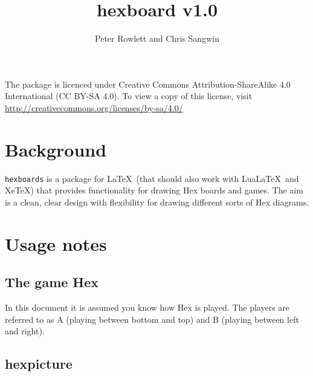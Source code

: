 \documentclass[a4paper,12pt]{article}
\title{hexboard v1.0}
\author{Peter Rowlett and Chris Sangwin}
\begin{document}
   
    
    \maketitle 
    
    The package is licenced under Creative Commons Attribution-ShareAlike 4.0 International (CC BY-SA 4.0). To view a copy of this license, visit \url{http://creativecommons.org/licenses/by-sa/4.0/}
    
    \begin{center}
        \begin{hexgame}[4]
        \end{hexgame}
    \end{center}
    
    \tableofcontents
    
    \section{Background}
    
    \verb|hexboards| is a package for \LaTeX\ (that should also work with Lua\LaTeX\ and Xe\TeX) that provides functionality for drawing Hex boards and games. The aim is a clean, clear design with flexibility for drawing different sorts of Hex diagrams. 
    
    \section{Usage notes}
    
    \subsection{The game Hex}
    
    In this document it is assumed you know how Hex is played. The players are referred to as A (playing between bottom and top) and B (playing between left and right).
    
    \subsection{hexpicture}
    
\end{document}
